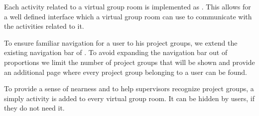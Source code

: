 Each activity related to a virtual group room is implemented as \block{}.
This allows for a well defined interface which a virtual group room can use to communicate with the activities related to it.

To ensure familiar navigation for a user to his project groups, we extend the existing navigation bar of \moodle{}.
To avoid expanding the navigation bar out of proportions we limit the number of project groups that will be shown and provide an additional page where every project group belonging to a user can be found.

To provide a sense of nearness and to help supervisors recognize project groups, a simply activity is added to every virtual group room.
It can be hidden by users, if they do not need it.













\FloatBarrier